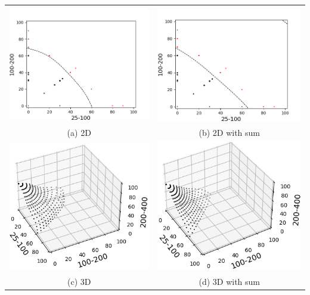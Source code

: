 \documentclass[10pt]{article}
\newenvironment{Figure}
  {\par\medskip\noindent\minipage{\linewidth}}
  {\endminipage\par\medskip}
\begin{document}
\begin{multicols}{2}
\begin{Figure}
  \begin{tabular}{cc}
    \includegraphics[width=0.45\columnwidth]{GP_2D.png} &   \includegraphics[width=0.45\columnwidth]{GP_2D_sum.png} \\
    (a) 2D & (b) 2D with sum \\[6pt]
    \includegraphics[width=0.45\columnwidth]{GP_3D.png} &   \includegraphics[width=0.45\columnwidth]{GP_3D_sum.png} \\
    (c) 3D & (d) 3D with sum \\[6pt]
  \end{tabular}
\end{Figure}
  

\end{multicols}
\end{document}
